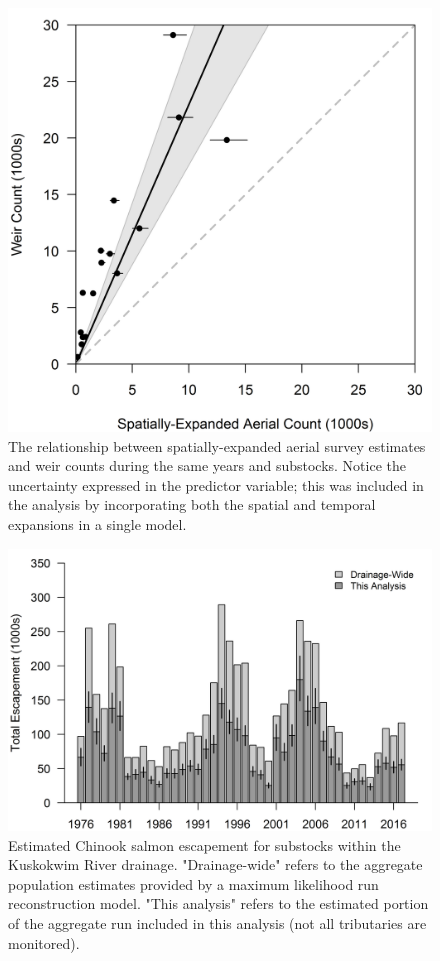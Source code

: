 \documentclass[12pt,]{book}
\theoremstyle{definition}
\theoremstyle{definition}
\theoremstyle{definition}
\theoremstyle{remark}
\begin{document}
\begin{figure}
  \centering
  \includegraphics{img/Ch4/obs-correct.png}
  \caption{The relationship between spatially-expanded aerial survey estimates and weir counts during the same years and substocks. Notice the uncertainty expressed in the predictor variable; this was included in the analysis by incorporating both the spatial and temporal expansions in a single model.}
  \label{fig:obs-correct}
\end{figure}

\clearpage

\begin{figure}
  \centering
  \includegraphics{img/Ch4/obs-fraction.png}
  \caption{Estimated Chinook salmon escapement for substocks within the Kuskokwim River drainage. "Drainage-wide" refers to the aggregate population estimates provided by a maximum likelihood run reconstruction model. "This analysis" refers to the estimated portion of the aggregate run included in this analysis (not all tributaries are monitored).}
  \label{fig:obs-fraction}
\end{figure}

\doublespacing

\setlength{\parskip}{6pt plus 2pt minus 1pt}


\end{document}
